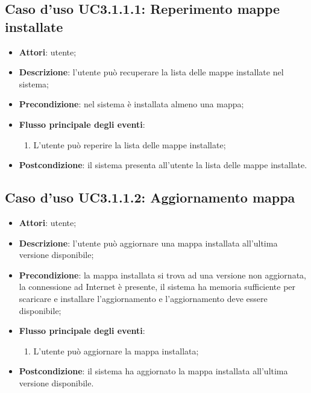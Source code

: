 \documentclass[../AnalisiDeiRequisiti.tex]{subfiles}
\begin{document}
\subsection{Caso d'uso UC3.1.1.1: Reperimento mappe installate}
\begin{itemize}
	\item \textbf{Attori}: utente;
	\item \textbf{Descrizione}: l'utente può recuperare la lista delle mappe installate nel sistema; 
	\item \textbf{Precondizione}: nel sistema è installata almeno una mappa;
	
	\item \textbf{Flusso principale degli eventi}:
	\begin{enumerate}
		\item L'utente può reperire la lista delle mappe installate;
		
	\end{enumerate}
	\item \textbf{Postcondizione}: il sistema presenta all'utente la lista delle mappe installate.
\end{itemize}
\hypertarget{UC3.1.1.2}{}
\subsection{Caso d'uso UC3.1.1.2: Aggiornamento mappa}
\begin{itemize}
	\item \textbf{Attori}: utente;
	\item \textbf{Descrizione}: l'utente può aggiornare una mappa installata all'ultima versione disponibile; 
	\item \textbf{Precondizione}: la mappa installata si trova ad una versione non aggiornata, la connessione ad Internet è presente, il sistema ha memoria sufficiente per scaricare e installare l'aggiornamento e l'aggiornamento deve essere disponibile;
	
	\item \textbf{Flusso principale degli eventi}:
	\begin{enumerate}
		\item L'utente può aggiornare la mappa installata;
		
	\end{enumerate}
	\item \textbf{Postcondizione}: il sistema ha aggiornato la mappa installata all'ultima versione disponibile.
\end{itemize}
\hypertarget{UC3.1.1.3}{}
\end{document}
